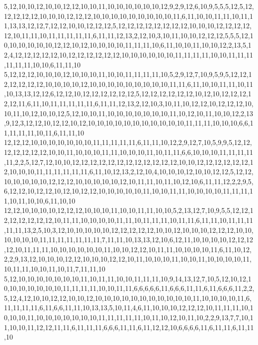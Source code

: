 5,12,10,10,12,10,10,12,12,10,10,11,10,10,10,10,10,10,12,9,2,9,12,6,10,9,5,5,5,12,5,12,12,12,12,12,10,10,10,12,12,12,10,10,10,10,10,10,10,10,10,11,6,11,10,10,11,11,10,11,11,13,13,12,12,7,12,12,10,10,12,12,12,5,12,12,12,12,12,12,12,12,10,10,10,12,12,12,12,12,10,11,11,10,11,11,11,11,11,6,11,11,12,13,2,12,10,3,10,11,10,10,12,12,12,5,5,5,12,10,10,10,10,10,10,12,12,10,12,10,10,10,10,11,11,11,10,6,11,10,10,11,10,10,12,2,13,5,12,4,12,12,12,12,12,10,12,12,12,12,12,12,10,10,10,10,10,10,11,11,11,11,10,10,11,11,11,11,11,11,10,10,6,11,11,10
5,12,12,12,10,10,10,12,10,10,10,11,10,10,11,11,11,11,10,5,2,9,12,7,10,9,5,9,5,12,12,12,12,12,12,12,10,10,10,10,12,10,10,10,10,10,10,10,10,10,11,11,6,11,10,10,11,11,10,11,10,13,13,12,12,6,12,12,10,12,12,12,12,12,12,5,12,12,12,12,12,12,10,12,10,12,12,12,12,12,11,6,11,10,11,11,11,11,11,6,11,11,12,13,2,12,10,3,10,11,10,12,12,10,12,12,12,10,10,11,10,12,10,10,12,5,12,10,10,11,10,10,10,10,10,10,10,11,10,12,10,11,10,10,12,2,13,9,12,3,12,12,10,12,12,10,12,10,10,10,10,10,10,10,10,10,10,10,11,11,11,10,10,10,6,6,11,11,11,11,10,11,6,11,11,10
12,12,12,10,10,10,10,10,10,10,11,11,11,11,11,6,11,11,10,12,2,9,12,7,10,5,9,9,5,12,12,12,12,12,12,12,10,10,11,10,10,10,11,11,10,10,10,11,10,11,11,6,6,10,10,10,11,11,11,11,11,2,2,5,12,7,12,10,10,12,12,12,12,12,12,12,12,12,12,12,12,10,10,12,12,12,12,12,12,12,10,10,10,11,11,11,11,11,11,6,11,10,12,13,2,12,10,4,10,10,10,12,10,10,12,12,5,12,12,10,10,10,10,10,12,12,12,10,10,10,10,10,12,10,11,11,10,11,10,12,10,6,11,11,12,2,2,9,5,6,12,12,10,12,12,10,12,10,12,12,10,10,10,10,10,11,10,10,11,11,10,10,10,10,11,11,11,11,10,11,10,10,6,11,10,10
12,12,10,10,10,10,12,12,12,10,10,10,11,10,10,11,11,10,10,5,2,13,12,7,10,9,5,5,12,12,12,12,12,12,12,12,10,11,11,10,10,10,10,11,11,10,11,11,11,10,11,11,6,11,11,10,11,11,11,11,11,13,2,5,10,3,12,10,10,10,10,10,12,12,12,12,12,10,10,12,10,10,10,12,12,12,10,10,10,10,10,10,11,11,11,11,11,11,11,7,11,11,10,13,13,12,10,6,12,11,10,10,10,10,12,12,12,12,10,11,11,11,10,10,10,10,10,10,11,10,10,12,12,10,11,11,10,10,10,10,11,6,11,10,12,2,2,9,13,12,10,10,10,12,12,10,10,10,12,12,10,11,10,10,10,11,10,10,11,10,10,10,10,11,10,11,11,10,10,11,10,11,7,11,11,10
5,12,10,10,10,10,10,10,10,11,10,11,11,10,10,11,11,11,10,9,14,13,12,7,10,5,12,10,12,10,10,10,10,10,10,10,11,11,11,11,10,10,11,11,6,6,6,6,6,11,6,6,6,11,11,6,11,6,6,6,11,2,2,5,12,4,12,10,10,12,12,10,10,12,10,10,10,10,10,10,10,10,10,10,10,11,10,10,10,10,11,6,11,11,11,11,6,11,6,6,11,11,10,13,13,5,10,11,4,6,11,10,10,10,12,12,12,10,11,11,11,10,10,10,10,11,10,10,10,10,10,10,10,11,11,11,11,11,10,11,10,12,10,11,10,2,2,9,13,7,7,10,11,10,10,11,12,12,11,11,6,11,11,11,6,6,6,11,11,6,11,12,12,10,6,6,6,6,11,6,11,11,6,11,11,10
